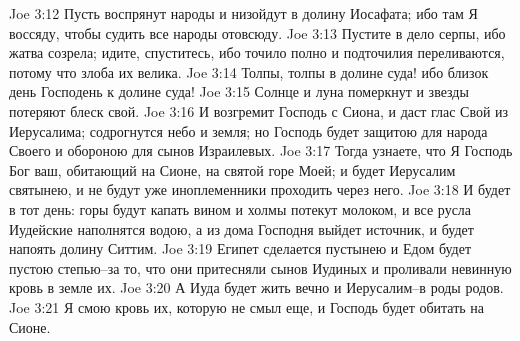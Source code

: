 Joe 3:12  Пусть воспрянут народы и низойдут в долину Иосафата; ибо там Я воссяду, чтобы судить все народы отовсюду.
Joe 3:13  Пустите в дело серпы, ибо жатва созрела; идите, спуститесь, ибо точило полно и подточилия переливаются, потому что злоба их велика.
Joe 3:14  Толпы, толпы в долине суда! ибо близок день Господень к долине суда!
Joe 3:15  Солнце и луна померкнут и звезды потеряют блеск свой.
Joe 3:16  И возгремит Господь с Сиона, и даст глас Свой из Иерусалима; содрогнутся небо и земля; но Господь будет защитою для народа Своего и обороною для сынов Израилевых.
Joe 3:17  Тогда узнаете, что Я Господь Бог ваш, обитающий на Сионе, на святой горе Моей; и будет Иерусалим святынею, и не будут уже иноплеменники проходить через него.
Joe 3:18  И будет в тот день: горы будут капать вином и холмы потекут молоком, и все русла Иудейские наполнятся водою, а из дома Господня выйдет источник, и будет напоять долину Ситтим.
Joe 3:19  Египет сделается пустынею и Едом будет пустою степью--за то, что они притесняли сынов Иудиных и проливали невинную кровь в земле их.
Joe 3:20  А Иуда будет жить вечно и Иерусалим--в роды родов.
Joe 3:21  Я смою кровь их, которую не смыл еще, и Господь будет обитать на Сионе.


